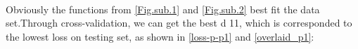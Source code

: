 \documentclass[a4paper,12pt]{article}
\begin{document}
\\
\begin{figure}[h]
\centering
{}
\end{figure}
\\
\begin{figure}[h]
\centering
{}
\end{figure}
\\
Obviously the functions from \ref{Fig.sub.1} and \ref{Fig.sub.2} best fit the data set.Through cross-validation, we can get the best d 11, which is corresponded to the lowest loss on testing set,  as shown in \ref{loss-p-p1} and \ref{overlaid_p1}:
\end{document}
